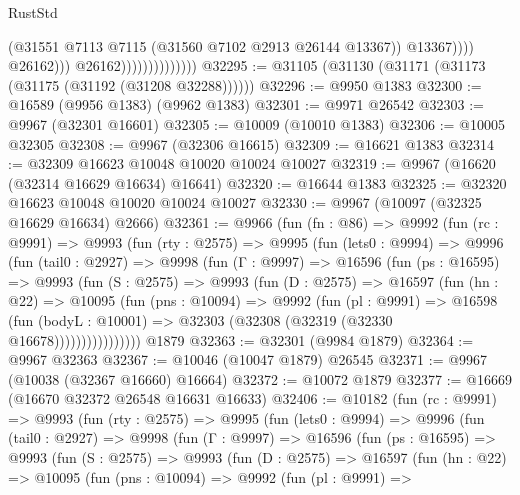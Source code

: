 \begin{lexlean}{RustStd}
\begin{coremodule}
                                              (@31551
                                                @7113
                                                @7115
                                                (@31560 @7102 @2913 @26144 @13367))
                                              @13367))))
                                      @26162)))
                                @26162))))))))))))))
@32295 := @31105 (@31130 (@31171 (@31173 (@31175 (@31192 (@31208 @32288))))))
@32296 := @9950 @1383
@32300 := @16589 (@9956 @1383) (@9962 @1383)
@32301 := @9971 @26542
@32303 := @9967 (@32301 @16601)
@32305 := @10009 (@10010 @1383)
@32306 := @10005 @32305
@32308 := @9967 (@32306 @16615)
@32309 := @16621 @1383
@32314 := @32309 @16623 @10048 @10020 @10024 @10027
@32319 := @9967 (@16620 (@32314 @16629 @16634) @16641)
@32320 := @16644 @1383
@32325 := @32320 @16623 @10048 @10020 @10024 @10027
@32330 := @9967 (@10097 (@32325 @16629 @16634) @2666)
@32361 := @9966
    (fun (fn : @86) =>
    @9992
      (fun (rc : @9991) =>
      @9993
        (fun (rty : @2575) =>
        @9995
          (fun (lets0 : @9994) =>
          @9996
            (fun (tail0 : @2927) =>
            @9998
              (fun (Γ : @9997) =>
              @16596
                (fun (ps : @16595) =>
                @9993
                  (fun (S : @2575) =>
                  @9993
                    (fun (D : @2575) =>
                    @16597
                      (fun (hn : @22) =>
                      @10095
                        (fun (pns : @10094) =>
                        @9992
                          (fun (pl : @9991) =>
                          @16598
                            (fun (bodyL : @10001) =>
                            @32303 (@32308 (@32319 (@32330 @16678))))))))))))))))
    @1879
@32363 := @32301 (@9984 @1879)
@32364 := @9967 @32363
@32367 := @10046 (@10047 @1879) @26545
@32371 := @9967 (@10038 (@32367 @16660) @16664)
@32372 := @10072 @1879
@32377 := @16669 (@16670 @32372 @26548 @16631 @16633)
@32406 := @10182
    (fun (rc : @9991) =>
    @9993
      (fun (rty : @2575) =>
      @9995
        (fun (lets0 : @9994) =>
        @9996
          (fun (tail0 : @2927) =>
          @9998
            (fun (Γ : @9997) =>
            @16596
              (fun (ps : @16595) =>
              @9993
                (fun (S : @2575) =>
                @9993
                  (fun (D : @2575) =>
                  @16597
                    (fun (hn : @22) =>
                    @10095
                      (fun (pns : @10094) =>
                      @9992
                        (fun (pl : @9991) =>

\end{coremodule}
\end{lexlean}
